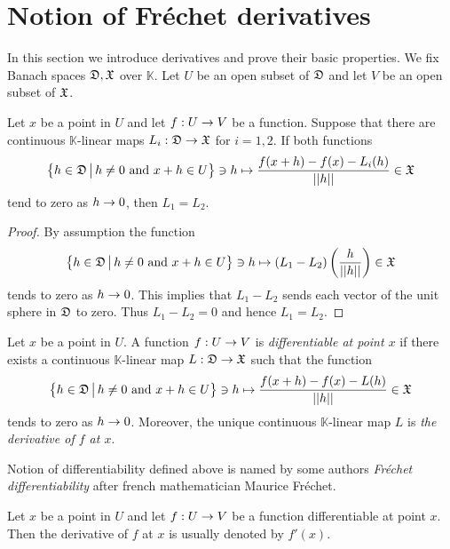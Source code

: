 \section{Notion of Fr{\'e}chet derivatives}
\noindent
In this section we introduce derivatives and prove their basic properties. We fix Banach spaces ${\mathfrak D},{\mathfrak X}$ over $\mathbb{K}$. Let $U$ be an open subset of ${\mathfrak D}$ and let $V$ be an open subset of ${\mathfrak X}$.

\begin{fact}\label{fact:uniqueness_of_derivative}
Let $x$ be a point in $U$ and let $f:U\rightarrow V$ be a function. Suppose that there are continuous $\mathbb{K}$-linear maps $L_i:{\mathfrak D}\rightarrow {\mathfrak X}$ for $i=1,2$. If both functions
$$\big\{h\in {\mathfrak D}\,\big|\,h\neq 0\mbox{ and }x+h\in U\big\} \ni h\mapsto \frac{f(x+h) - f(x) - L_i(h)}{||h||} \in {\mathfrak X}$$
tend to zero as $h\rightarrow 0$, then $L_1 = L_2$.
\end{fact}
\begin{proof}
By assumption the function
$$\big\{h\in {\mathfrak D}\,\big|\,h\neq 0\mbox{ and }x+h\in U\big\} \ni h\mapsto \left(L_1 - L_2\right)\left(\frac{h}{||h||}\right) \in {\mathfrak X}$$
tends to zero as $h\rightarrow 0$. This implies that $L_1 - L_2$ sends each vector of the unit sphere in ${\mathfrak D}$ to zero. Thus $L_1 - L_2 = 0$ and hence $L_1 = L_2$. 
\end{proof}

\begin{definition}
Let $x$ be a point in $U$. A function $f:U\rightarrow V$ is \textit{differentiable at point $x$} if there exists a continuous $\mathbb{K}$-linear map $L:{\mathfrak D}\rightarrow {\mathfrak X}$ such that the function 
$$\big\{h\in {\mathfrak D}\,\big|\,h\neq 0\mbox{ and }x+h\in U\big\} \ni h\mapsto \frac{f(x+h) - f(x) - L(h)}{||h||} \in {\mathfrak X}$$
tends to zero as $h\rightarrow 0$. Moreover, the unique continuous $\mathbb{K}$-linear map $L$ is \textit{the derivative of $f$ at $x$}.
\end{definition}

\begin{remark}\label{remark:Fr{\'e}chet_derivative}
Notion of differentiability defined above is named by some authors \textit{Fr{\'e}chet differentiability} after french mathematician Maurice Fr{\'e}chet.
\end{remark}
    
\begin{remark}\label{remark:notation_for_derivative}
Let $x$ be a point in $U$ and let $f:U\rightarrow V$ be a function differentiable at point $x$. Then the derivative of $f$ at $x$ is usually denoted by $f'(x)$.
\end{remark}

